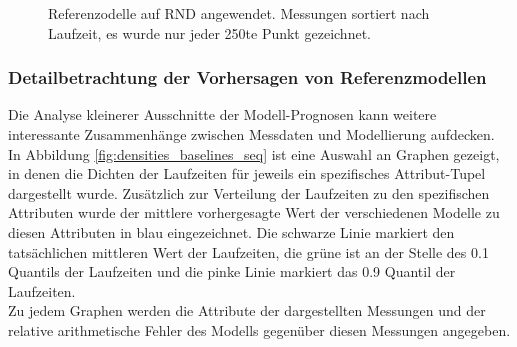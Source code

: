 \documentclass[
	12pt,
	a4paper,
	BCOR10mm,
	DIV14,
	listof=totoc,
	bibliography=totoc,
	headsepline
]{scrreprt}
\begin{document}
\begin{figure}
	\hfill
	\caption{Referenzodelle auf RND angewendet. Messungen sortiert nach Laufzeit, es wurde nur jeder 250te Punkt gezeichnet.}
	\label{fig:zeit_baselines_sorted_rnd}
\end{figure} 
\clearpage
\subsubsection{Detailbetrachtung der Vorhersagen von Referenzmodellen}
Die Analyse kleinerer Ausschnitte der Modell-Prognosen kann weitere interessante Zusammenhänge zwischen Messdaten und Modellierung aufdecken.\\
In Abbildung \ref{fig:densities_baselines_seq} ist eine Auswahl an Graphen gezeigt, in denen die Dichten der Laufzeiten für jeweils ein spezifisches Attribut-Tupel dargestellt wurde.
Zusätzlich zur Verteilung der Laufzeiten zu den spezifischen Attributen wurde der mittlere vorhergesagte Wert der verschiedenen Modelle zu diesen Attributen in blau eingezeichnet.
Die schwarze Linie markiert den tatsächlichen mittleren Wert der Laufzeiten, die grüne ist an der Stelle des 0.1 Quantils der Laufzeiten und die pinke Linie markiert das 0.9 Quantil der Laufzeiten.\\
Zu jedem Graphen werden die Attribute der dargestellten Messungen und der relative arithmetische Fehler des Modells gegenüber diesen Messungen angegeben.\medskip
\end{document}
